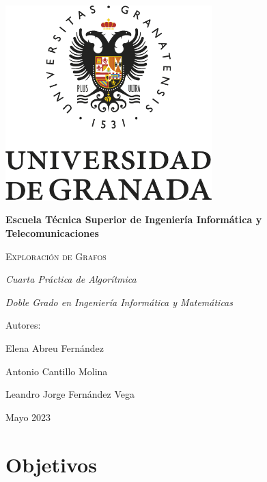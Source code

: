 \documentclass[a4paper,12pt,twoside]{article} %
\begin{document}
\begin{titlepage}
\centering

{\includegraphics[width=0.6\textwidth]{foto_portada.png}\par}
\vspace{1cm}

{\bfseries\LARGE Escuela Técnica Superior de Ingeniería Informática y Telecomunicaciones \par}
\vspace{0.4cm}

{\scshape\Huge Exploración de Grafos \par}
\vspace{0.4cm}

{\itshape\Large Cuarta Práctica de Algorítmica \par}
\vspace{0.5cm}

{\itshape\Large Doble Grado en Ingeniería Informática y Matemáticas \par}
\vspace{0.4cm}

{\Large Autores: \par}
{\Large Elena Abreu Fernández \par}
{\Large Antonio Cantillo Molina \par}
{\Large Leandro Jorge Fernández Vega \par}
\vfill

{\Large Mayo 2023 \par}

\end{titlepage}

\tableofcontents
\newpage


\section{Objetivos}
\end{document}
